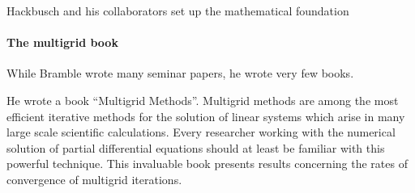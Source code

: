 \documentclass[CJK,11pt]{amsart}
\theoremstyle{definition}
\begin{document}
\begin{CJK*}{UTF8}{gbsn}
Hackbusch and his collaborators set up the mathematical foundation 


\paragraph{The multigrid book}  While Bramble wrote many seminar papers, he wrote very few books. 

He wrote a book “Multigrid Methods”. Multigrid methods are among the most efficient iterative methods for the solution of linear systems which arise in many large scale scientific calculations. Every researcher working with the numerical solution of partial differential equations should at least be familiar with this powerful technique. This invaluable book presents results concerning the rates of convergence of multigrid iterations.




\end{CJK*}
\end{document}
